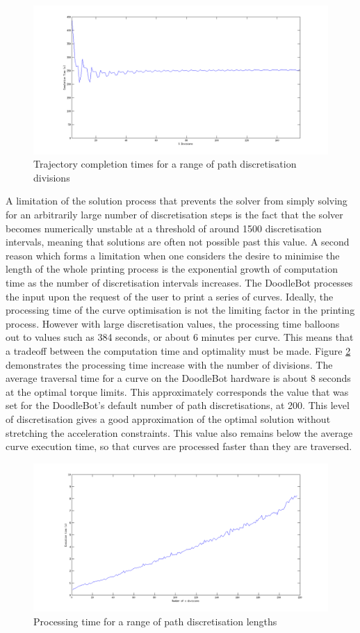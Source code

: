 \begin{figure}[htbp]  
\includegraphics[width=\textwidth]{figures/performance/sDivisions.png}
\caption[Trajectory completion time for a range of path discretisation lengths]{Trajectory completion times for a range of path discretisation divisions
\label{fig:sDivisions}}
\end{figure} 

A limitation of the solution process that prevents the solver from simply solving for an arbitrarily large number of discretisation steps is the fact that the solver becomes numerically unstable at a threshold of around 1500 discretisation intervals, meaning that solutions are often not possible past this value. A second reason which forms a limitation when one considers the desire to minimise the length of the whole printing process is the exponential growth of computation time as the number of discretisation intervals increases. The DoodleBot processes the input upon the request of the user to print a series of curves. Ideally, the processing time of the curve optimisation is not the limiting factor in the printing process. However with large discretisation values, the processing time balloons out to values such as 384 seconds, or about 6 minutes per curve. This means that a tradeoff between the computation time and optimality must be made. Figure \ref{fig:sDivTime} demonstrates the processing time increase with the number of divisions. The average traversal time for a curve on the DoodleBot hardware is about 8 seconds at the optimal torque limits. This approximately corresponds the value that was set for the DoodleBot's default number of path discretisations, at 200. This level of discretisation gives a good approximation of the optimal solution without stretching the acceleration constraints. This value also remains below the average curve execution time, so that curves are processed faster than they are traversed.

\begin{figure}[htbp]  
\includegraphics[width=\textwidth]{figures/performance/sDivTime.png}
\caption[Processing time for a range of path discretisation lengths]{Processing time for a range of path discretisation lengths
\label{fig:sDivTime}}
\end{figure} 


